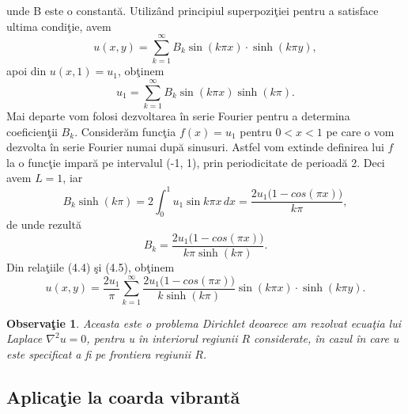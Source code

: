 \documentclass[a4paper,openany,12pt]{report}
\newtheorem{notice}{Observa\c tie}[section]
\begin{document}
unde B este o constant\u a.
\newline
Utiliz\^ and principiul superpozi\c tiei pentru a satisface ultima condi\c tie, avem
\begin{equation}
u(x,y)=\sum_{k=1}^\infty B_k \sin(k\pi x)\cdot \sinh(k \pi y), 
\end{equation}
apoi din $u(x, 1)=u_1$, ob\c tinem
\begin{equation*}
u_1= \sum_{k=1}^\infty B_k \sin(k\pi x)\sinh(k \pi).
\end{equation*}
Mai departe vom folosi dezvoltarea \^ in serie Fourier pentru a determina coeficien\c tii $B_k$. Consider\u am func\c tia $f(x)=u_1$ pentru $0<x<1$ pe care o vom dezvolta \^ in serie Fourier numai dup\u a sinusuri. Astfel vom extinde definirea lui $f$ la o func\c tie impar\u a pe intervalul (-1, 1), prin periodicitate de perioad\u a 2. Deci avem $L=1$, iar
\begin{equation*}
B_k \sinh(k \pi)=2\int_0^1u_1\sin{k\pi x}\, dx =\frac{2u_1\big(1-cos(\pi x)\big)}{k\pi},
\end{equation*}
de unde rezult\u a
\begin{equation}
B_k=\frac{2u_1\big(1-cos(\pi x)\big)}{k\pi \sinh(k \pi)}.
\end{equation}
Din rela\c tiile (4.4) \c si (4.5), ob\c tinem
\begin{equation*}
u(x,y)=\frac{2u_1}{\pi}\sum_{k=1}^\infty\frac{2u_1\big(1-cos(\pi x)\big)}{k \sinh(k \pi)}\sin(k\pi x)\cdot \sinh(k \pi y).
\end{equation*}
\begin{notice}Aceasta este o problema Dirichlet deoarece am rezolvat ecua\c tia lui Laplace $\nabla^2u=0$, pentru u \^ in interiorul regiunii $R$ considerate, \^ in cazul \^ in care u este specificat a fi pe frontiera regiunii $R$. 
\end{notice}




\subsection*{Aplica\c tie la coarda vibrant\u a}
\end{document}
